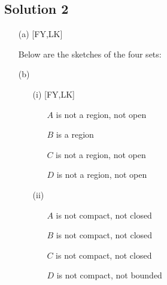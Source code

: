 \subsection*{Solution 2}

\begin{itemize}
\item[(a)][FY,LK]

Below are the sketches of the four sets:



\item[(b)]
\begin{itemize}
\item[(i)][FY,LK]

\begin{itemize}
\item[$A$] is not a region, not open
\item[$B$] is a region
\item[$C$] is not a region, not open
\item[$D$] is not a region, not open
\end{itemize}

\item[(ii)]

\begin{itemize}
\item[$A$] is not compact, not closed
\item[$B$] is not compact, not closed
\item[$C$] is not compact, not closed
\item[$D$] is not compact, not bounded
\end{itemize}

\end{itemize}

\end{itemize}

